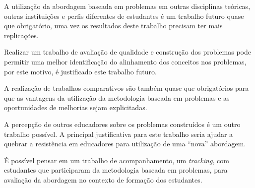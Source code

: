 A utilização da abordagem baseada em problemas em
outras disciplinas teóricas, outras instituições
e perfis diferentes de estudantes
é um trabalho futuro quase que obrigatório, uma vez
os resultados deste trabalho precisam ter mais
replicações.

Realizar um trabalho de avaliação de qualidade e
construção dos problemas pode permitir uma melhor
identificação do alinhamento dos conceitos nos
problemas, por este motivo, é justificado este
trabalho futuro.

A realização de trabalhos comparativos são também quase
que obrigatórios para que as vantagens da utilização
da metodologia baseada em problemas e as oportunidades
de melhorias sejam explicitadas.

A percepção de outros educadores sobre os problemas
construídos é um outro trabalho possível.
A principal justificativa para este trabalho seria
ajudar a quebrar a resistência em educadores para
utilização de uma ``nova'' abordagem.

É possível pensar em um trabalho de acompanhamento,
um \textit{tracking}, com estudantes que participaram
da metodologia baseada em problemas, para avaliação
da abordagem no contexto de formação dos estudantes.



